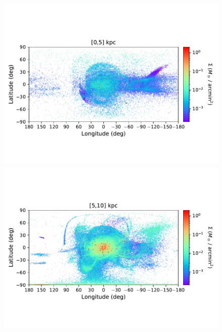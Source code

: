 \begin{figure}[h!]
\begin{center}
            \includegraphics[clip=true, trim = 0mm 20mm 0mm 20mm, width=0.9\columnwidth]{images/PII_ensemble_LB_D0-5_mass_est_new.pdf}
            \includegraphics[clip=true, trim = 0mm 20mm 0mm 20mm, width=0.9\columnwidth]{images/PII_ensemble_LB_D5-10_mass_est_new.pdf}


\end{center}
\end{figure}
